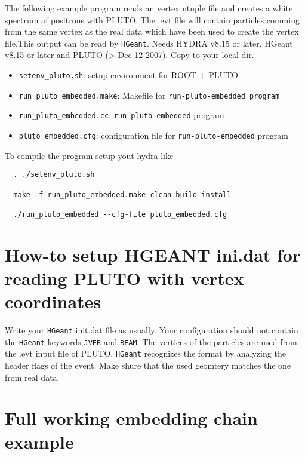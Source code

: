 The following example program reads an vertex ntuple file and creates a 
white spectrum of positrons with PLUTO. The .evt file will contain particles 
comming from the same vertex as the real data which have been used to 
create the vertex file.This output can be read by \verb+HGeant+. Needs 
HYDRA v8.15 or later, HGeant v8.15 or later and PLUTO (> Dec 12 2007). 
Copy to your local dir.

\begin{itemize}
    \item \verb+setenv_pluto.sh+: setup environment for ROOT + PLUTO

    \item \verb+run_pluto_embedded.make+: Makefile for 
    \verb+run-pluto-embedded program+

    \item \verb+run_pluto_embedded.cc+: \verb+run-pluto-embedded+ program

    \item \verb+pluto_embedded.cfg+: configuration file for 
    \verb+run-pluto-embedded+ program
\end{itemize}

To compile the program setup yout hydra like

\begin{lstlisting}
  . ./setenv_pluto.sh

  make -f run_pluto_embedded.make clean build install

  ./run_pluto_embedded --cfg-file pluto_embedded.cfg
\end{lstlisting}



\section{How-to setup HGEANT ini.dat for reading PLUTO with vertex coordinates}

Write your \verb+HGeant+ init.dat file as usually. Your configuration should not 
contain the \verb+HGeant+ keywords \verb+JVER+ and \verb+BEAM+. The vertices of the 
particles are used from the .evt input file of PLUTO. \verb+HGeant+ recognizes the 
format by analyzing the header flags of the event. Make shure that the used 
geomtery matches the one from real data.

\section{Full working embedding chain example}


